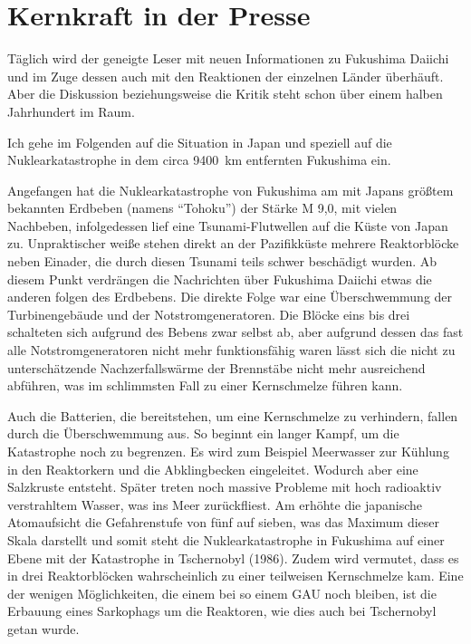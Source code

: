 \section{Kernkraft in der Presse}
Täglich wird der geneigte Leser mit neuen Informationen zu Fukushima Daiichi und im Zuge dessen auch mit den Reaktionen der
einzelnen Länder überhäuft. Aber die Diskussion beziehungsweise die Kritik steht schon über einem halben Jahrhundert im
Raum.

\bigskip
Ich gehe im Folgenden auf die Situation in Japan und speziell auf die Nuklearkatastrophe in dem circa
\SI{9400}{\kilo\meter} entfernten Fukushima ein.

Angefangen hat die Nuklearkatastrophe von Fukushima am  mit Japans größtem bekannten Erdbeben
(namens \enquote{Tohoku}) der Stärke M 9,0, mit vielen Nachbeben, infolgedessen lief
eine Tsunami-Flutwellen auf die
Küste von Japan zu. Unpraktischer weiße stehen direkt an der Pazifikküste mehrere Reaktorblöcke neben Einader, die durch
diesen Tsunami teils schwer beschädigt wurden. Ab diesem Punkt verdrängen die Nachrichten über Fukushima Daiichi etwas die
anderen folgen des Erdbebens. Die direkte Folge war eine Überschwemmung der Turbinengebäude und der Notstromgeneratoren.
Die Blöcke eins bis drei schalteten sich aufgrund des Bebens zwar selbst ab, aber aufgrund dessen das fast alle Notstromgeneratoren
nicht mehr funktionsfähig waren lässt sich die nicht zu unterschätzende Nachzerfallswärme der Brennstäbe nicht mehr
ausreichend abführen, was im schlimmsten Fall zu einer Kernschmelze führen kann.

Auch die Batterien, die bereitstehen, um eine Kernschmelze zu verhindern, fallen durch die Überschwemmung aus. So beginnt
ein langer Kampf, um die Katastrophe noch zu begrenzen. Es wird zum Beispiel Meerwasser zur Kühlung in den Reaktorkern und
die Abklingbecken eingeleitet. Wodurch aber eine Salzkruste entsteht.
Später treten noch massive Probleme mit hoch radioaktiv verstrahltem Wasser, was ins Meer
zurückfliest. Am  erhöhte die japanische Atomaufsicht
die Gefahrenstufe von fünf auf sieben, was das Maximum dieser Skala darstellt und somit steht die
Nuklearkatastrophe in Fukushima auf einer Ebene mit der
Katastrophe in Tschernobyl (1986).
Zudem wird vermutet, dass es in drei Reaktorblöcken wahrscheinlich zu einer teilweisen Kernschmelze kam.
Eine der wenigen Möglichkeiten, die einem bei so einem GAU noch bleiben, ist die Erbauung eines  Sarkophags um die
Reaktoren, wie dies auch bei Tschernobyl getan wurde.

